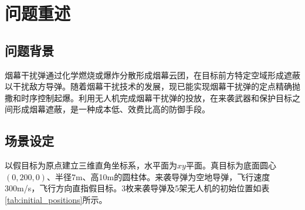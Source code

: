 \documentclass[12pt,a4paper]{ctexart}
\begin{document}
\begin{abstract}
针对\textbf{问题5}，处理5机多弹（至多15枚）协同干扰3枚导弹的\textbf{超大规模组合优化}。搜索空间约60维，直接优化不可行。创新性提出\textbf{逆运动学方法}：在弹目连线(LOS)上采样目标起爆点$(C_{\text{target}}, t_{\text{det}})$，反算可行参数$(\theta,v,t_{\text{drop}},\Delta t)$，将60维搜索转化为可控采样。设计了\textbf{能力矩阵评估 → 贪婪时间窗口填充 → 交叉导弹遮蔽利用 → 圆柱爬山精修}四阶段求解框架。能力矩阵揭示：FY1擅长M1（弹道中心），FY3/FY4擅长M2（偏南），FY5擅长M3（偏南）。贪婪填充阶段每轮选择边际贡献最大的（无人机，导弹）对，交叉注册将已投弹对邻接导弹的遮蔽自动利用。最终三弹总遮蔽时长\textbf{41.60s}（M1: 18.13s, M2: 16.41s, M3: 7.06s），使用12枚弹，剩余3枚的边际贡献已低于0.03s阈值。

\textbf{模型特色与创新}：(1) 切线锥几何模型严格刻画空间遮蔽关系；(2) 逆运动学方法将60维组合优化转化为物理引导的采样；(3) 暖启动+DE+NM的混合优化框架有效应对高维狭窄可行域；(4) 三层验证体系（单点→圆柱采样→解析求根）确保结果可靠；(5) 降维回退和弹3拯救机制体现了自适应策略设计。

\vspace{1em}
\noindent\textbf{关键词}：烟幕干扰弹；差分进化算法；逆运动学；切线锥模型；遮蔽时长优化；贪婪算法；收敛性分析
\end{abstract}

\newpage\tableofcontents\newpage

\section{问题重述}

\subsection{问题背景}
烟幕干扰弹通过化学燃烧或爆炸分散形成烟幕云团，在目标前方特定空域形成遮蔽以干扰敌方导弹。随着烟幕干扰技术的发展，现已能实现烟幕干扰弹的定点精确抛撒和时序控制起爆。利用无人机完成烟幕干扰弹的投放，在来袭武器和保护目标之间形成烟幕遮蔽，是一种成本低、效费比高的防御手段。

\subsection{场景设定}
以假目标为原点建立三维直角坐标系，水平面为$xy$平面。真目标为底面圆心$(0,200,0)$、半径7m、高10m的圆柱体。来袭导弹为空地导弹，飞行速度300m/s，飞行方向直指假目标。3枚来袭导弹及5架无人机的初始位置如表\ref{tab:initial_positions}所示。
\end{document}
